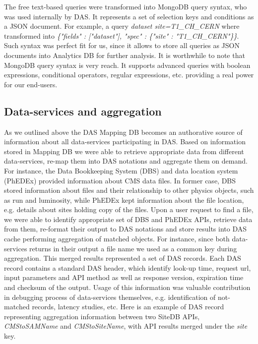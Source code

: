 \documentclass[a4paper]{jpconf}
\begin{document}
The free text-based queries were transformed into MongoDB query syntax, 
who was used internally by DAS. It represents a set of selection 
keys and conditions as a JSON document. For example, a query
{\it dataset site=T1\_CH\_CERN}
where transformed into 
{\it \{"fields" : ["dataset"], "spec" : \{"site" : "T1\_CH\_CERN"\}\}}.
Such syntax was perfect fit for us, since it allows to store all queries
as JSON documents into Analytics DB for further analysis. It is worthwhile to note that
MongoDB query syntax is very reach. It supports advanced queries with 
boolean expressions, conditional operators, regular expressions, etc. providing
a real power for our end-users.

\subsection{Data-services and aggregation}
As we outlined above the DAS Mapping DB becomes an authorative
source of information about all data-services participating in DAS.
Based on information stored in Mapping DB we were able to 
retrieve appropriate data from different data-services, re-map them into 
DAS notations and aggregate them on demand. For instance, the Data 
Bookkeeping System (DBS) and data location system (PhEDEx)
provided information about CMS data files. In former case, DBS 
stored information about files and their relationship to other 
physics objects, such as run and luminosity, while PhEDEx kept
information about the file location, e.g. details about sites 
holding copy of the files. Upon a user request to find a file, 
we were able to identify appropriate set of DBS and PhEDEx APIs, 
retrieve data from them, re-format their output to DAS notations 
and store results into DAS cache performing aggregation of matched 
objects. For instance, since both data-services returns in their
output a file name we used as a common key during aggregation.
This merged results represented a set of DAS records. Each DAS
record contains a standard DAS header, which identify look-up time,
request url, input parameters and API method as well as response 
version, expiration time and checksum of the output. Usage of this 
information was valuable contribution in debugging process of
data-services themselves, e.g. identification of not-matched records, 
latency studies, etc. Here is an example of DAS record representing
aggregation information between two SiteDB APIs, {\it CMStoSAMName} 
and {\it CMStoSiteName}, with API results merged under the {\it site} key.
\end{document}
